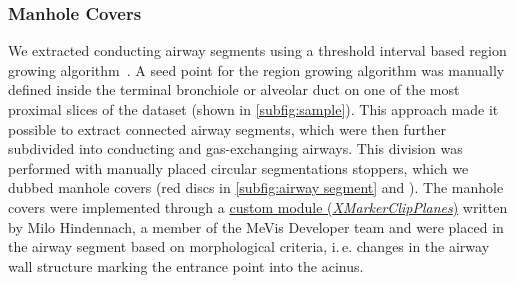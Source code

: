 \documentclass[%
	paper=a4,%
	abstract=true,%
	]{scrartcl}
\newcommand{\ie}{i.\,e.\xspace}
\begin{document}
\subsubsection{Manhole Covers}
We extracted conducting airway segments using a threshold interval based region growing algorithm~\cite{Zucker1976}. A seed point for the region growing algorithm was manually defined inside the terminal bronchiole or alveolar duct on one of the most proximal slices of the dataset (shown in \autoref{subfig:sample}). This approach made it possible to extract connected airway segments, which were then further subdivided into conducting and gas-exchanging airways. This division was performed with manually placed circular segmentations stoppers, which we dubbed manhole covers (red discs in \autoref{subfig:airway segment} and ). The manhole covers were implemented through a \href{http://www.mevis-research.de/cgi-bin/discus/board-auth.cgi?lm=1282233250&file=/839/11760.html}{custom module (\emph{XMarkerClipPlanes})} written by Milo Hindennach, a member of the MeVis Developer team and were placed in the airway segment based on morphological criteria, \ie changes in the airway wall structure marking the entrance point into the acinus.
\end{document}
